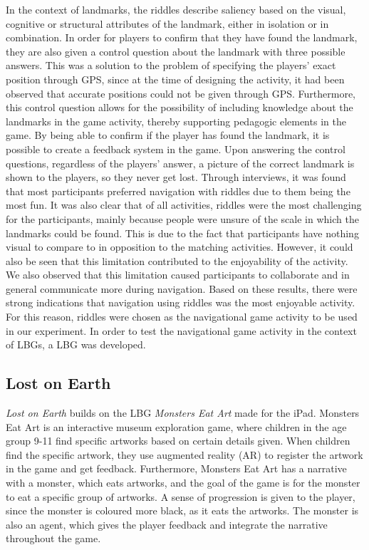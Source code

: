 In the context of landmarks, the riddles describe saliency based on the visual, cognitive or structural attributes of the landmark, either in isolation or in combination. In order for players to confirm that they have found the landmark, they are also given a control question about the landmark with three possible answers. This was a solution to the problem of specifying the players' exact position through GPS, since at the time of designing the activity, it had been observed that accurate positions could not be given through GPS. Furthermore, this control question allows for the possibility of including knowledge about the landmarks in the game activity, thereby supporting pedagogic elements in the game. By being able to confirm if the player has found the landmark, it is possible to create a feedback system in the game. Upon answering the control questions, regardless of the players' answer, a picture of the correct landmark is shown to the players, so they never get lost. Through interviews, it was found that most participants preferred navigation with riddles due to them being the most fun. It was also clear that of all activities, riddles were the most challenging for the participants, mainly because people were unsure of the scale in which the landmarks could be found. This is due to the fact that participants have nothing visual to compare to in opposition to the matching activities. However, it could also be seen that this limitation contributed to the enjoyability of the activity. We also observed that this limitation caused participants to collaborate and in general communicate more during navigation. Based on these results, there were strong indications that navigation using riddles was the most enjoyable activity. For this reason, riddles were chosen as the navigational game activity to be used in our experiment. In order to test the navigational game activity in the context of LBGs, a LBG was developed.

\subsection{Lost on Earth}
\textit{Lost on Earth} builds on the LBG \textit{Monsters Eat Art}\cite{Lynge} made for the iPad. Monsters Eat Art is an interactive museum exploration game, where children in the age group 9-11 find specific artworks based on certain details given. When children find the specific artwork, they use augmented reality (AR) to register the artwork in the game and get feedback. Furthermore, Monsters Eat Art has a narrative with a monster, which eats artworks, and the goal of the game is for the monster to eat a specific group of artworks. A sense of progression is given to the player, since the monster is coloured more black, as it eats the artworks. The monster is also an agent, which gives the player feedback and integrate the narrative throughout the game.

